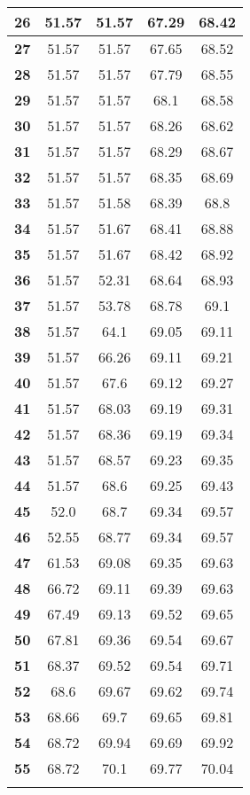 \begin{longtable}{|c|c|c|c|c|}
\textbf{26} & 51.57 & 51.57 & 67.29 & 68.42 \\ \hline 
\textbf{27} & 51.57 & 51.57 & 67.65 & 68.52 \\ \hline 
\textbf{28} & 51.57 & 51.57 & 67.79 & 68.55 \\ \hline 
\textbf{29} & 51.57 & 51.57 & 68.1 & 68.58 \\ \hline 
\textbf{30} & 51.57 & 51.57 & 68.26 & 68.62 \\ \hline 
\textbf{31} & 51.57 & 51.57 & 68.29 & 68.67 \\ \hline 
\textbf{32} & 51.57 & 51.57 & 68.35 & 68.69 \\ \hline 
\textbf{33} & 51.57 & 51.58 & 68.39 & 68.8 \\ \hline 
\textbf{34} & 51.57 & 51.67 & 68.41 & 68.88 \\ \hline 
\textbf{35} & 51.57 & 51.67 & 68.42 & 68.92 \\ \hline 
\textbf{36} & 51.57 & 52.31 & 68.64 & 68.93 \\ \hline 
\textbf{37} & 51.57 & 53.78 & 68.78 & 69.1 \\ \hline 
\textbf{38} & 51.57 & 64.1 & 69.05 & 69.11 \\ \hline 
\textbf{39} & 51.57 & 66.26 & 69.11 & 69.21 \\ \hline 
\textbf{40} & 51.57 & 67.6 & 69.12 & 69.27 \\ \hline 
\textbf{41} & 51.57 & 68.03 & 69.19 & 69.31 \\ \hline 
\textbf{42} & 51.57 & 68.36 & 69.19 & 69.34 \\ \hline 
\textbf{43} & 51.57 & 68.57 & 69.23 & 69.35 \\ \hline 
\textbf{44} & 51.57 & 68.6 & 69.25 & 69.43 \\ \hline 
\textbf{45} & 52.0 & 68.7 & 69.34 & 69.57 \\ \hline 
\textbf{46} & 52.55 & 68.77 & 69.34 & 69.57 \\ \hline 
\textbf{47} & 61.53 & 69.08 & 69.35 & 69.63 \\ \hline 
\textbf{48} & 66.72 & 69.11 & 69.39 & 69.63 \\ \hline 
\textbf{49} & 67.49 & 69.13 & 69.52 & 69.65 \\ \hline 
\textbf{50} & 67.81 & 69.36 & 69.54 & 69.67 \\ \hline 
\textbf{51} & 68.37 & 69.52 & 69.54 & 69.71 \\ \hline 
\textbf{52} & 68.6 & 69.67 & 69.62 & 69.74 \\ \hline 
\textbf{53} & 68.66 & 69.7 & 69.65 & 69.81 \\ \hline 
\textbf{54} & 68.72 & 69.94 & 69.69 & 69.92 \\ \hline 
\textbf{55} & 68.72 & 70.1 & 69.77 & 70.04 \\ \hline 

    \caption[]{}
    \label{Tab:}
\end{longtable}
